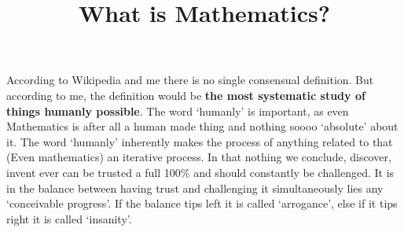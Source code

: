 \documentclass[12pt]{article}
\title{What is Mathematics?}
\author{}
\begin{document}
\maketitle

According to Wikipedia and me there is no single consensual definition.
But according to me, the definition would be \textbf{the most systematic study of things humanly possible}.
The word `humanly' is important, as even Mathematics is after all a human made thing and nothing soooo `absolute' about it.
The word `humanly' inherently makes the process of anything related to that (Even mathematics) an iterative process.
In that nothing we conclude, discover, invent ever can be trusted a full 100\% and should constantly be challenged.
It is in the balance between having trust and challenging it simultaneously lies any `conceivable progress'.
If the balance tips left it is called `arrogance', else if it tips right it is called  `insanity'.
\end{document}
